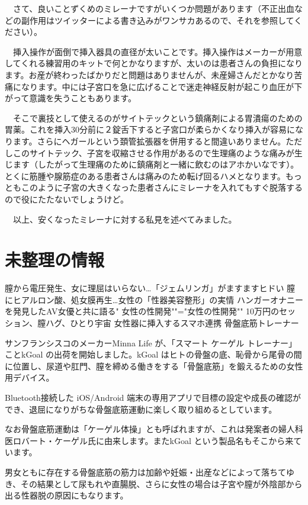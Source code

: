 　さて、良いことずくめのミレーナですがいくつか問題があります（不正出血などの副作用はツイッターによる書き込みがワンサカあるので、それを参照してください）。

　挿入操作が面倒で挿入器具の直径が太いことです。挿入操作はメーカーが用意してくれる練習用のキットで何とかなりますが、太いのは患者さんの負担になります。お産が終わったばかりだと問題はありませんが、未産婦さんだとかなり苦痛になります。中には子宮口を急に広げることで迷走神経反射が起こり血圧が下がって意識を失うこともあります。

　そこで裏技として使えるのがサイトテックという鎮痛剤による胃潰瘍のための胃薬。これを挿入30分前に２錠舌下すると子宮口が柔らかくなり挿入が容易になります。さらにヘガールという頚管拡張器を併用すると間違いありません。ただしこのサイトテック、子宮を収縮させる作用があるので生理痛のような痛みが生じます（したがって生理痛のために鎮痛剤と一緒に飲むのはアホかいなです）。とくに筋腫や腺筋症のある患者さんは痛みのため転げ回るハメとなります。もっともこのように子宮の大きくなった患者さんにミレーナを入れてもすぐ脱落するので役にたたないでしょうけど。

　以上、安くなったミレーナに対する私見を述べてみました。

\section{未整理の情報}

膣から電圧発生、女に理屈はいらない…「ジェムリンガ」がますますヒドい
膣にヒアルロン酸、処女膜再生…女性の「性器美容整形」の実情
ハンガーオナニーを発見したAV女優と共に語る" 女性の性開発""="女性の性開発""
10万円のセッション、膣ハグ、ひとり宇宙
女性器に挿入するスマホ連携 骨盤底筋トレーナー

サンフランシスコのメーカーMinna Life が、「スマート ケーゲル トレーナー」ことkGoal の出荷を開始しました。kGoal はヒトの骨盤の底、恥骨から尾骨の間に位置し、尿道や肛門、膣を締める働きをする「骨盤底筋」を鍛えるための女性用デバイス。

Bluetooth接続した iOS/Android 端末の専用アプリで目標の設定や成長の確認ができ、退屈になりがちな骨盤底筋運動に楽しく取り組めるとしています。

なお骨盤底筋運動は「ケーゲル体操」とも呼ばれますが、これは発案者の婦人科医ロバート・ケーゲル氏に由来します。またkGoal という製品名もそこから来ています。


男女ともに存在する骨盤底筋の筋力は加齢や妊娠・出産などによって落ちてゆき、その結果として尿もれや直腸脱、さらに女性の場合は子宮や膣が外陰部から出る性器脱の原因にもなります。

